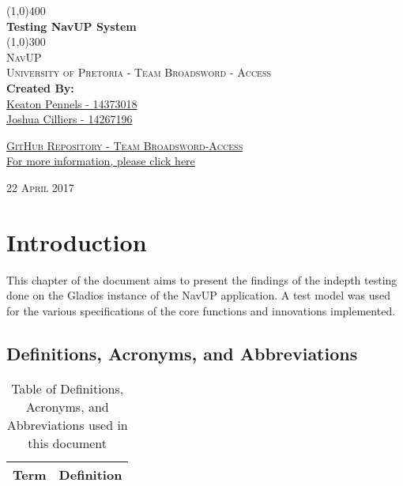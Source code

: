 \documentclass{article}
\begin{document}
	\begin{titlepage}
		\begin{center}

			\line(1,0){400}\\
			[6mm]
			\huge{
				\bfseries Testing NavUP System
			}\\
			[2mm]
			\line(1,0){300}\\
			[15mm]
			\textsc{\large NavUP}\\
			[7.5mm]
			\textsc{\large University of Pretoria - Team Broadsword - Access}\\
			[20mm]
			\large{\textbf{Created By:}}\\
			[2mm]
			\large{	
				\href{https://github.com/KeatonPennels}{Keaton Pennels - 14373018}\\
				\href{https://github.com/JoshC117}{Joshua Cilliers - 14267196}\\
			
				}
	

		\href{https://github.com/KeatonPennels/COS-301-Broadsword-Access}{\textsc{\Large GitHub Repository - Team Broadsword-Access}\\[2mm]
		  For more information, please click here}

		\end{center}
		\begin{flushright}
			\textsc{\large 22 April 2017}
		\end{flushright}
	\end{titlepage}

	\cleardoublepage
	\thispagestyle{empty}
	\tableofcontents
	\cleardoublepage

	\thispagestyle{empty}
	\listoffigures
	\cleardoublepage
	\setcounter{page}{1}
	\section{Introduction}\label{sec:intro}

				This chapter of the document aims to present the findings of the indepth testing done on the Gladios instance of the NavUP application. A test model was used for the various specifications of the core functions and innovations implemented.

		\subsection{Definitions, Acronyms, and Abbreviations}\label{subsec:daa}
			\begin{table}[h!]
				\centering
				\caption{Table of Definitions, Acronyms, and Abbreviations used in this document}
				\label{tab: Table 1}
				\begin{tabular}{| m{4cm} | m{12cm} |}
					\hline
					\textbf{Term} & \textbf{Definition} \\
					\hline
					\hline

		
					\hline
					

				\end{tabular}
			\end{table}
\end{document}
